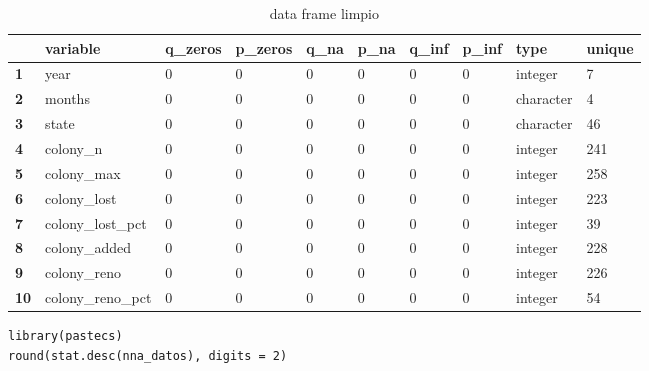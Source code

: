 \documentclass[b4paper]{article}
\begin{document}
    \begin{table}[h]
        \centering
\begin{tabular}{l|l|l|l|l|l|l|l|l|l|}
\cline{2-10}
                                  & \textbf{variable} & \textbf{q\_zeros} & \textbf{p\_zeros} & \textbf{q\_na} & \textbf{p\_na} & \textbf{q\_inf} & \textbf{p\_inf} & \textbf{type} & \textbf{unique} \\ \hline
\multicolumn{1}{|l|}{\textbf{1}}  & year              & 0                 & 0                 & 0              & 0              & 0               & 0               & integer       & 7               \\ \hline
\multicolumn{1}{|l|}{\textbf{2}}  & months            & 0                 & 0                 & 0              & 0              & 0               & 0               & character     & 4               \\ \hline
\multicolumn{1}{|l|}{\textbf{3}}  & state             & 0                 & 0                 & 0              & 0              & 0               & 0               & character     & 46              \\ \hline
\multicolumn{1}{|l|}{\textbf{4}}  & colony\_n         & 0                 & 0                 & 0              & 0              & 0               & 0               & integer       & 241             \\ \hline
\multicolumn{1}{|l|}{\textbf{5}}  & colony\_max       & 0                 & 0                 & 0              & 0              & 0               & 0               & integer       & 258             \\ \hline
\multicolumn{1}{|l|}{\textbf{6}}  & colony\_lost      & 0                 & 0                 & 0              & 0              & 0               & 0               & integer       & 223             \\ \hline
\multicolumn{1}{|l|}{\textbf{7}}  & colony\_lost\_pct & 0                 & 0                 & 0              & 0              & 0               & 0               & integer       & 39              \\ \hline
\multicolumn{1}{|l|}{\textbf{8}}  & colony\_added     & 0                 & 0                 & 0              & 0              & 0               & 0               & integer       & 228             \\ \hline
\multicolumn{1}{|l|}{\textbf{9}}  & colony\_reno      & 0                 & 0                 & 0              & 0              & 0               & 0               & integer       & 226             \\ \hline
\multicolumn{1}{|l|}{\textbf{10}} & colony\_reno\_pct & 0                 & 0                 & 0              & 0              & 0               & 0               & integer       & 54              \\ \hline
\end{tabular}
        \caption{data frame limpio}
\end{table}
    \begin{tcolorbox}
        \begin{verbatim}
library(pastecs)
round(stat.desc(nna_datos), digits = 2)\end{verbatim}
    \end{tcolorbox}
    
\end{document}

